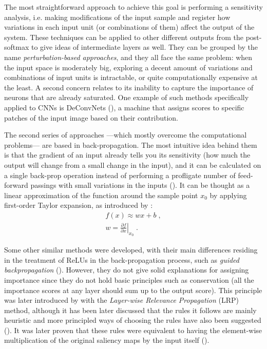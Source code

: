 The most straightforward approach to achieve this goal is performing a sensitivity analysis, i.e. making modifications of the input sample and register how variations in each input unit (or combinations of them) affect the output of the system. These techniques can be applied to other different outputs from the post-softmax to give ideas of intermediate layers as well. They can be grouped by the name \textit{perturbation-based approaches}, and they all face the same problem: when the input space is moderately big, exploring a decent amount of variations and combinations of input units is intractable, or quite computationally expensive at the least. A second concern relates to its inability to capture the importance of neurons that are already saturated. One example of such methods specifically applied to CNNs is DeConvNets (\cite{Zeiler2014}), a machine that assigns scores to specific patches of the input image based on their contribution.

The second series of approaches ---which mostly overcome the computational problems--- are based in back-propagation. The most intuitive idea behind them is that the gradient of an input already tells you its sensitivity (how much the output will change from a small change in the input), and it can be calculated on a single back-prop operation instead of performing a profligate number of feed-forward passings with small variations in the inputs (\cite{Shrikumar2017}). It can be thought as a linear approximation of the function around the sample point $x_0$ by applying first-order Taylor expansion, as introduced by \cite{Simonyan2014}:
\begin{align}
f(x) \approx w x + b \; , \nonumber \\
w = \left. \frac{\partial f}{\partial x} \right|_{x_0} \; .
\end{align}

Some other similar methods were developed, with their main differences residing in the treatment of ReLUs in the back-propagation process, such as \textit{guided backpropagation} (\cite{Springenberg2014}). However, they do not give solid explanations for assigning importance since they do not hold basic principles such as conservation (all the importance scores at any layer should sum up to the output score). This principle was later introduced by \cite{Bach2015} with the \textit{Layer-wise Relevance Propagation} (LRP) method, although it has been later discussed that the rules it follows are mainly heuristic and more principled ways of choosing the rules have also been suggested (\cite{Montavon2017}). It was later proven that these rules were equivalent to having the element-wise multiplication of the original saliency maps by the input itself (\cite{Shrikumar2016}).

